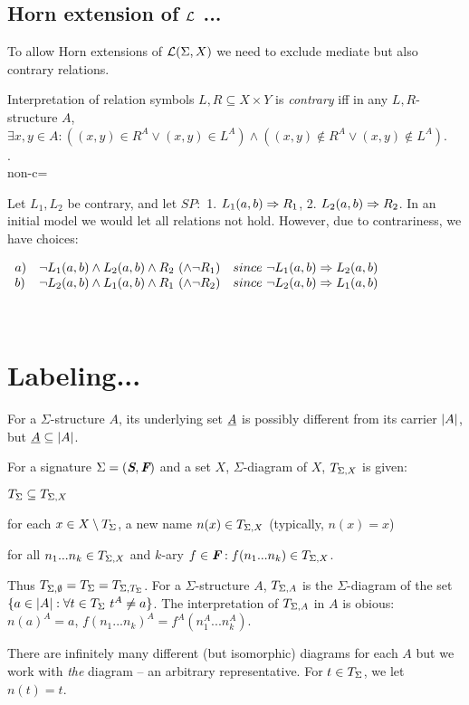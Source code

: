 \documentclass[12pt]{article}
\begin{document}
\subsection{Horn extension of ${{\cal{L}}}$ ...}
To allow Horn extensions of ${{\cal{L}}}(\Sigma,X)$ we need to exclude
mediate but also contrary relations.
\begin{Definition}
Interpretation of relation symbols $L,R\subseteq X\times Y$ is {\em contrary}
iff in any $L,R$-structure $A$, $\exists x,y\in A:
((x,y)\in R^A\lor (x,y)\in L^A) \land ((x,y)\not\in R^A\lor (x,y)\not\in
L^A)$. \\ .
 \\
non-c= 
\end{Definition}

\begin{Example}
Let $L_1,L_2$ be contrary, and let
$SP:$ 1. $L_1(a,b)\Rightarrow R_1$, 2. $L_2(a,b)\Rightarrow R_2$. In an initial
model we would let all relations not hold. However, due to contrariness, we
have choices:

$\begin{array}{lll}
a) & \neg L_1(a,b) \land L_2(a,b) \land R_2\ (\land \neg R_1) & 
   since\ \neg L_1(a,b)\Rightarrow L_2(a,b)\\
b) & \neg L_2(a,b) \land L_1(a,b) \land R_1\ (\land \neg R_2) & 
   since\ \neg L_2(a,b)\Rightarrow L_1(a,b)
\end{array}
$
\end{Example}

\newpage
\ 

\newpage
\section{Labeling...}
For a $\Sigma$-structure $A$, its underlying set $\underline {A}$ is possibly
different from its carrier $|A|$, but $\underline {A}\subseteq|A|$.
\begin{Definition}
For a signature $\Sigma=(\mbox{\bf{\em S}},\mbox{\bf{\em F}})$ and a set $X$,
$\Sigma$-diagram of $X$, $T_{\Sigma,X}$ is given:
\begin{enum}
\item $T_{\Sigma} \subseteq T_{\Sigma,X}$
\item for each $x\in X\setminus T_{\Sigma}$,  a new name $n(x)\in T_{\Sigma,X}$ (typically, $n(x)=x$)
\item for all $n_1...n_k\in T_{\Sigma,X}$ and $k$-ary $f\in\mbox{\bf{\em F}}: f(n_1...n_k)\in T_{\Sigma,X}$.
\end{enum}
Thus $T_{\Sigma,\emptyset}=T_{\Sigma}=T_{\Sigma,{\scriptsize{T_{\Sigma}}}}$. For a $\Sigma$-structure
$A$, $T_{\Sigma,A}$ is the $\Sigma$-diagram of the set
$\{a\in\car A:\forall t\in\GTerms\ t^A\not=a\}$.
The interpretation of $T_{\Sigma,A}$ in $A$ is obious: $n(a)^A=a$,
$f(n_1...n_k)^A= f^A(n_1^A...n_k^A)$. 
\end{Definition}
There are infinitely many different (but isomorphic) diagrams for each $A$ but we work with
{\em the} diagram -- an arbitrary representative. For $t\in T_{\Sigma}$, we let $n(t)=t$.
\end{document}
